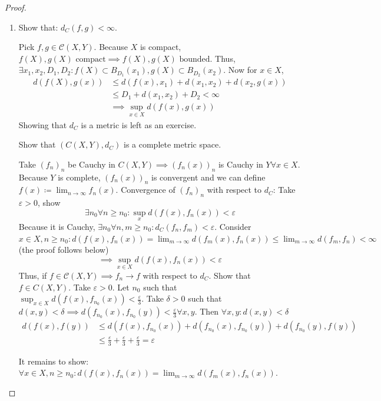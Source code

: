 \documentclass{article}
\numberwithin{lecref}{section}
\begin{document}
\begin{proof}
	\begin{enumerate}
		\item Show that: $d_C(f, g) < \infty$.

			Pick $f, g \in \mathcal C(X, Y)$. Because $X$ is compact, $f(X), g(X) \text{ compact} \implies f(X), g(X) \text{ bounded}$.
			Thus, $\exists x_1, x_2, D_1, D_2: f(X) \subset B_{D_1}(x_1), g(X) \subset B_{D_2}(x_2)$.
			Now for $x \in X$,
			\begin{align*}
				d(f(X), g(x)) &\leq d(f(x), x_1) + d(x_1, x_2) + d(x_2, g(x)) \\
					&\leq D_1 + d(x_1, x_2) + D_2 < \infty \\
					&\implies \sup_{x \in X} d(f(x), g(x))
			\end{align*}
			Showing that $d_C$ is a metric is left as an exercise.

			Show that $(C(X, Y), d_C)$ is a complete metric space.

			Take $(f_n)_n$ be Cauchy in $C(X, Y) \implies (f_n(x))_n$ is Cauchy in $Y \forall x \in X$.
			Because $Y$ is complete, $(f_n(x))_n$ is convergent and we can define $f(x) \coloneqq \lim_{n \to \infty} f_n(x)$.
			Convergence of $(f_n)_n$ with respect to $d_C$:
			Take $\varepsilon > 0$, show
			\[ \exists n_0 \forall n \geq n_0: \sup_x d(f(x), f_n(x)) < \varepsilon \]
			Because it is Cauchy, $\exists n_0 \forall n, m \geq n_0: d_C(f_n, f_m) < \varepsilon$.
			Consider $x \in X, n \geq n_0: d(f(x), f_n(x)) = \lim_{m \to \infty} d(f_m(x), f_n(x)) \leq \lim_{m\to\infty} d(f_m, f_n) < \infty$ (the proof follows below)
			\[ \implies \sup_{x \in X} d(f(x), f_n(x)) < \varepsilon \]
			Thus, if $f \in \mathcal C(X, Y) \implies f_n \to f$ with respect to $d_C$.
			Show that $f \in C(X, Y)$. Take $\varepsilon > 0$. Let $n_0$ such that $\sup_{x \in X} d(f(x), f_{n_0}(x)) < \frac{\varepsilon}{3}$.
			Take $\delta > 0$ such that $d(x, y) < \delta \implies d(f_{n_0}(x), f_{n_0}(y)) < \frac\varepsilon3 \forall x, y$.
			Then $\forall x, y: d(x, y) < \delta$
			\begin{align*}
				d(f(x), f(y))
					&\leq  d(f(x), f_{n_0}(x)) + d(f_{n_0}(x), f_{n_0}(y)) + d(f_{n_0}(y), f(y)) \\
					&\leq \frac\varepsilon3 + \frac\varepsilon3 + \frac\varepsilon3 = \varepsilon
			\end{align*}

			It remains to show: $\forall x \in X, n \geq n_0: d(f(x), f_n(x)) = \lim_{m \to \infty} d(f_m(x), f_n(x))$.


\end{enumerate}
\end{proof}
\end{document}
